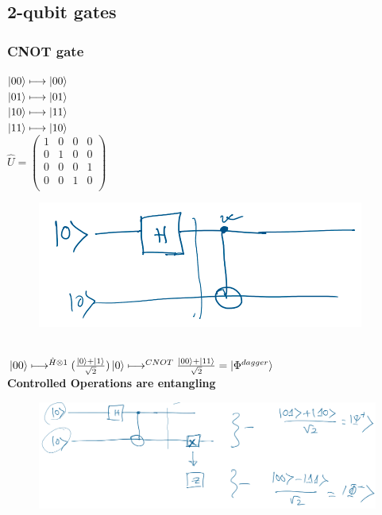 \documentclass[11.5pt, paper=a4]{article}
\theoremstyle{definition}
\numberwithin{theorem}{section}
\begin{document}
\subsection{2-qubit gates}
\subsubsection{CNOT gate}
$\ket{00} \longmapsto \ket{00}$ \\
$\ket{01} \longmapsto \ket{01}$ \\
$\ket{10} \longmapsto \ket{11}$ \\
$\ket{11} \longmapsto \ket{10}$ \\
$ \hat{U} = \begin{pmatrix}
1 & 0 & 0 & 0 \\
0 & 1 & 0 & 0 \\
0 & 0 & 0 & 1 \\
0 & 0 & 1 & 0 \\
\end{pmatrix} $
\begin{figure}[h]
    \centering
    \includegraphics[scale=0.5]{images/CNOT gate.png}
\end{figure}\\
$\ket{00} \longmapsto^{\hat{H} \otimes 1} (\frac{\ket{0} + \ket{1}}{\sqrt{2}})\ket{0}  \longmapsto^{CNOT} \frac{\ket{00}+\ket{11}}{\sqrt{2}} = \ket{\Phi^{dagger}}$ \\
\newpage
\textbf{Controlled Operations are entangling}
\begin{figure}[h]
    \centering
    \includegraphics[scale=0.4]{images/entangling.png}
\end{figure}\\
\end{document}
